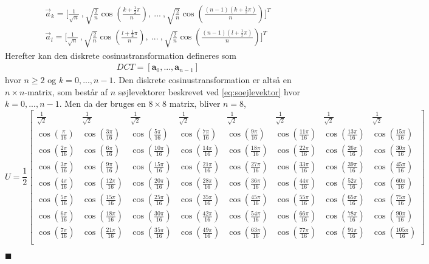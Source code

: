 \begin{align}
\vec{a}_k = \Bigg[\frac{1}{\sqrt{n}}\ , \sqrt{\frac{2}{n}} \cos(\frac{k+\frac{1}{2}\pi}{n}),\ ... \ ,\sqrt{\frac{2}{n}} \cos(\frac{(n-1)(k+\frac{1}{2}\pi)}{n})\Bigg]^T \\
\label{eq:soejlevektor}
\vec{a}_l = \Bigg[\frac{1}{\sqrt{n}}\ , \sqrt{\frac{2}{n}} \cos(\frac{l+\frac{1}{2}\pi}{n}),\ ... \ ,\sqrt{\frac{2}{n}} \cos(\frac{(n-1)(l+\frac{1}{2}\pi)}{n})\Bigg]^T
\end{align}
Herefter kan den diskrete cosinustransformation defineres som
\begin{align}
DCT=[\textbf{a}_0,...,\textbf{a}_{n-1}]
\end{align}
hvor $n \geq 2$ og $k=0,...,n-1$. Den diskrete cosinustransformation er altså en $n \times n$-matrix, som består af $n$ søjlevektorer beskrevet ved \vref{eq:soejlevektor} hvor $k=0,...,n-1$.
Men da der bruges en $8 \times 8$ matrix, bliver $n = 8$,
\begin{equation}
U= \frac{1}{2}
\begin{bmatrix}
	\frac{1}{\sqrt{2}}		& \frac{1}{\sqrt{2}}		& \frac{1}{\sqrt{2}}			& \frac{1}{\sqrt{2}}		& \frac{1}{\sqrt{2}}			& \frac{1}{\sqrt{2}}		& \frac{1}{\sqrt{2}} 			&\frac{1}{\sqrt{2}}			\\
	\cos(\frac{\pi}{16})		& \cos(\frac{3\pi}{16})	& \cos(\frac{5\pi}{16})	& \cos(\frac{7\pi}{16})	
& \cos(\frac{9\pi}{16})	& \cos(\frac{11\pi}{16})
& \cos(\frac{13\pi}{16})	& \cos(\frac{15\pi}{16})		\\
	\cos(\frac{2\pi}{16})	& \cos(\frac{6\pi}{16})	& \cos(\frac{10\pi}{16})	& \cos(\frac{14\pi}{16})	& \cos(\frac{18\pi}{16})	& \cos(\frac{22\pi}{16})	& \cos(\frac{26\pi}{16})	& \cos(\frac{30\pi}{16})		\\
	\cos(\frac{3\pi}{16})	& \cos(\frac{9\pi}{16})	& \cos(\frac{15\pi}{16})	& \cos(\frac{21\pi}{16})	& \cos(\frac{27\pi}{16})	& \cos(\frac{33\pi}{16})	& \cos(\frac{39\pi}{16})	& \cos(\frac{45\pi}{16})		\\
	\cos(\frac{4\pi}{16})	& \cos(\frac{12\pi}{16})	& \cos(\frac{20\pi}{16})	& \cos(\frac{28\pi}{16})	& \cos(\frac{36\pi}{16})	& \cos(\frac{44\pi}{16})	& \cos(\frac{52\pi}{16})	& \cos(\frac{60\pi}{16})		\\
	\cos(\frac{5\pi}{16})	& \cos(\frac{15\pi}{16})	& \cos(\frac{25\pi}{16})	& \cos(\frac{35\pi}{16})	& \cos(\frac{45\pi}{16})	& \cos(\frac{55\pi}{16})	& \cos(\frac{65\pi}{16})	& \cos(\frac{75\pi}{16})		\\
	\cos(\frac{6\pi}{16})	& \cos(\frac{18\pi}{16})	& \cos(\frac{30\pi}{16})	& \cos(\frac{42\pi}{16})	& \cos(\frac{54\pi}{16})	& \cos(\frac{66\pi}{16})	& \cos(\frac{78\pi}{16})	& \cos(\frac{90\pi}{16})		\\
	\cos(\frac{7\pi}{16})	& \cos(\frac{21\pi}{16})	& \cos(\frac{35\pi}{16})	& \cos(\frac{49\pi}{16})	& \cos(\frac{63\pi}{16})	& \cos(\frac{77\pi}{16})	& \cos(\frac{91\pi}{16})	& \cos(\frac{105\pi}{16})	\\
\end{bmatrix}
\label{eq:standardDCTmatrice}
\end{equation}
\begin{flushright}
$\blacksquare$
\end{flushright}